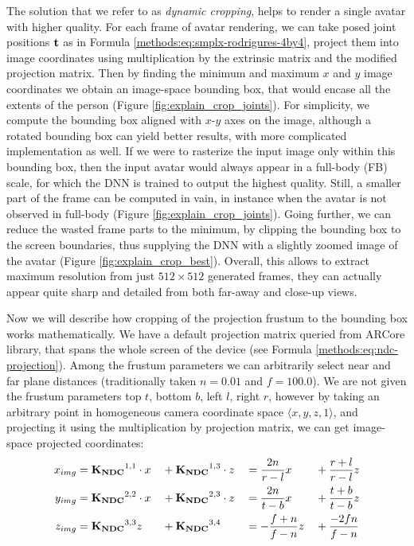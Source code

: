The solution that we refer to as \textit{dynamic cropping}, helps to render a single avatar with higher quality. For each frame of avatar rendering, we can take posed joint positions $\bm{\mathrm{t}}$ as in Formula \ref{methods:eq:smplx-rodrigures-4by4}, project them into image coordinates using multiplication by the extrinsic matrix and the modified projection matrix. Then by finding the minimum and maximum $x$ and $y$ image coordinates we obtain an image-space bounding box, that would encase all the extents of the person (Figure \ref{fig:explain_crop_joints}). For simplicity, we compute the bounding box aligned with $x$-$y$ axes on the image, although a rotated bounding box can yield better results, with more complicated implementation as well. If we were to rasterize the input image only within this bounding box, then the input avatar would always appear in a full-body (FB) scale, for which the DNN is trained to output the highest quality. Still, a smaller part of the frame can be computed in vain, in instance when the avatar is not observed in full-body (Figure \ref{fig:explain_crop_joints}). Going further, we can reduce the wasted frame parts to the minimum, by clipping the bounding box to the screen boundaries, thus supplying the DNN with a slightly zoomed image of the avatar (Figure \ref{fig:explain_crop_best}). Overall, this allows to extract maximum resolution from just $512 \times 512$ generated frames, they can actually appear quite sharp and detailed from both far-away and close-up views.

Now we will describe how cropping of the projection frustum to the bounding box works mathematically. We have a default projection matrix queried from ARCore library, that spans the whole screen of the device (see Formula \ref{methods:eq:ndc-projection}). Among the frustum parameters we can arbitrarily select near and far plane distances (traditionally taken $n=0.01$ and $f=100.0$). We are not given the frustum parameters top $t$, bottom $b$, left $l$, right $r$, however by taking an arbitrary point in homogeneous camera coordinate space $\langle x, y, z, 1 \rangle$, and projecting it using the multiplication by projection matrix, we can get image-space projected coordinates:
\begin{alignat}{4}
	x_{img} &= \bm{\mathrm{K_{NDC}}}^{1,1}\cdot x &&+ \bm{\mathrm{K_{NDC}}}^{1,3}\cdot z &&= \dfrac{2n}{r-l}x &&+ \dfrac{r + l}{r - l}z \label{methods:eq:project-coords-x}\\
	y_{img} &= \bm{\mathrm{K_{NDC}}}^{2,2}\cdot x &&+ \bm{\mathrm{K_{NDC}}}^{2,3}\cdot z &&= \dfrac{2n}{t-b}x &&+ \dfrac{t + b}{t - b}z  \label{methods:eq:project-coords-y}\\
	z_{img} &= \bm{\mathrm{K_{NDC}}}^{3,3}z &&+ \bm{\mathrm{K_{NDC}}}^{3,4} &&= -\dfrac{f + n}{f - n}z &&+ \dfrac{-2fn}{f - n} \label{methods:eq:project-coords-z}	
\end{alignat}

